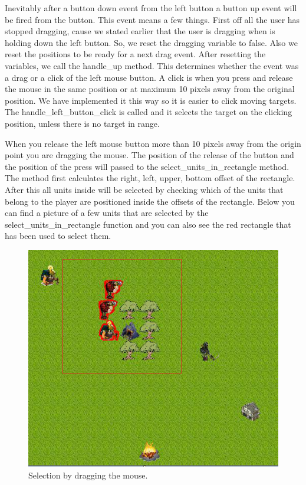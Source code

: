 Inevitably after a button down event from the left button a button up event will be fired from the button. This event means a few things. First off all the user has stopped dragging, cause we stated earlier that the user is dragging when is holding down the left button. So, we reset the dragging variable to false. Also we reset the positions to be ready for a next drag event. After resetting the variables, we call the handle\_up method. This determines whether the event was a drag or a click of the left mouse button. A click is when you press and release the mouse in the same position or at maximum 10 pixels away from the original position. We have implemented it this way so it is easier to click moving targets. The handle\_left\_button\_click is called and it selects the target on the clicking position, unless there is no target in range.

When you release the left mouse button more than 10 pixels away from the origin point you are dragging the mouse. The position of the release of the button and the position of the press will passed to the select\_units\_in\_rectangle method. The method first calculates the right, left, upper, bottom offset of the rectangle. After this all units inside will be selected by checking which of the units that belong to the player are positioned inside the offsets of the rectangle. Below you can find a picture of a few units that are selected by the select\_units\_in\_rectangle function and you can also see the red rectangle that has been used to select them. 

\begin{figure}[!htb]
    \centering
    \includegraphics[scale=1.0]{res/SelectionRectangle.png}
    \caption{Selection by dragging the mouse.}
\end{figure}
\newpage
